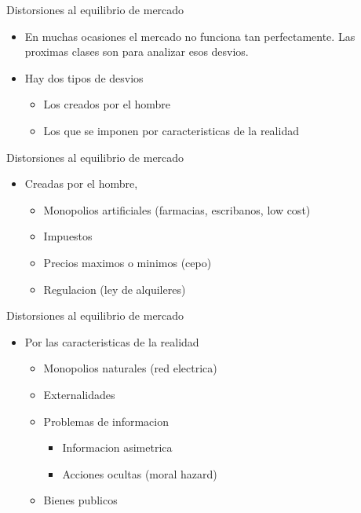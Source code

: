 \documentclass{beamer}
\begin{document}
\begin{frame}{Distorsiones al equilibrio de mercado}
    \begin{itemize}
        \item En muchas ocasiones el mercado no funciona tan perfectamente. Las proximas clases son para analizar esos desvios.
        \item Hay dos tipos de desvios
        \begin{itemize}
            \item Los creados por el hombre
            \item Los que se imponen por caracteristicas de la realidad
        \end{itemize}
    \end{itemize}
\end{frame}


\begin{frame}{Distorsiones al equilibrio de mercado}
    \begin{itemize}
        \item Creadas por el hombre, 
        \begin{itemize}
            \item Monopolios artificiales (farmacias, escribanos, low cost)
            \item Impuestos
            \item Precios maximos o minimos (cepo)
            \item Regulacion (ley de alquileres)
        
        \end{itemize}
    \end{itemize}
\end{frame}

\begin{frame}{Distorsiones al equilibrio de mercado}
    \begin{itemize}
        \item Por las caracteristicas de la realidad 
        \begin{itemize}
            \item Monopolios naturales (red electrica)            \item Externalidades
            \item Problemas de informacion
            \begin{itemize}
                \item Informacion asimetrica
                \item Acciones ocultas (moral hazard)
            \end{itemize}
            \item Bienes publicos 
        
        \end{itemize}
    \end{itemize}
\end{frame}
\end{document}
